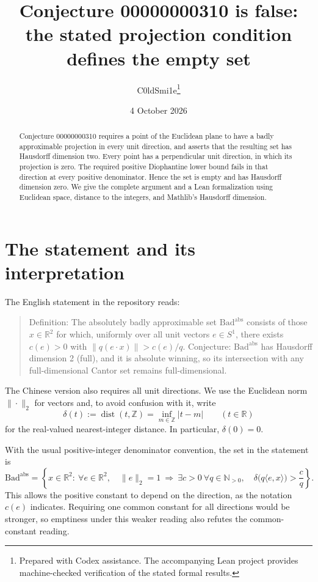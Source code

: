 \documentclass[11pt]{article}
\title{Conjecture 00000000310 is false:\\the stated projection condition defines the empty set}
\author{C0ldSmi1e\thanks{Prepared with Codex assistance. The accompanying Lean project provides machine-checked verification of the stated formal results.}}
\date{4 October 2026}
\newcommand{\R}{\mathbb R}
\newcommand{\Z}{\mathbb Z}
\newcommand{\N}{\mathbb N}
\newcommand{\Bad}{\mathrm{Bad}^{\mathrm{abs}}}
\newcommand{\ip}[2]{\langle #1,#2\rangle}
\begin{document}
\maketitle
\begin{abstract}
Conjecture 00000000310 requires a point of the Euclidean plane to have a badly approximable projection in every unit direction, and asserts that the resulting set has Hausdorff dimension two. Every point has a perpendicular unit direction, in which its projection is zero. The required positive Diophantine lower bound fails in that direction at every positive denominator. Hence the set is empty and has Hausdorff dimension zero. We give the complete argument and a Lean formalization using Euclidean space, distance to the integers, and Mathlib's Hausdorff dimension.
\end{abstract}

\section{The statement and its interpretation}
The English statement in the repository reads:
\begin{quote}
Definition: The absolutely badly approximable set $\Bad$ consists of those $x\in\R^2$ for which, uniformly over all unit vectors $e\in S^1$, there exists $c(e)>0$ with $\|q(e\cdot x)\|>c(e)/q$. Conjecture: $\Bad$ has Hausdorff dimension 2 (full), and it is absolute winning, so its intersection with any full-dimensional Cantor set remains full-dimensional.
\end{quote}
The Chinese version also requires all unit directions. We use the Euclidean norm $\|\cdot\|_2$ for vectors and, to avoid confusion with it, write
\[
 \delta(t):=\operatorname{dist}(t,\Z)=\inf_{m\in\Z}|t-m|
 \qquad(t\in\R)
\]
for the real-valued nearest-integer distance. In particular, $\delta(0)=0$.

With the usual positive-integer denominator convention, the set in the statement is
\[
 \Bad=\left\{x\in\R^2:\ \forall e\in\R^2,\quad
 \|e\|_2=1\ \Longrightarrow\ \exists c>0\ \forall q\in\N_{>0},\quad
 \delta\bigl(q\ip{e}{x}\bigr)>\frac{c}{q}\right\}.
\]
This allows the positive constant to depend on the direction, as the notation $c(e)$ indicates. Requiring one common constant for all directions would be stronger, so emptiness under this weaker reading also refutes the common-constant reading.
\end{document}
